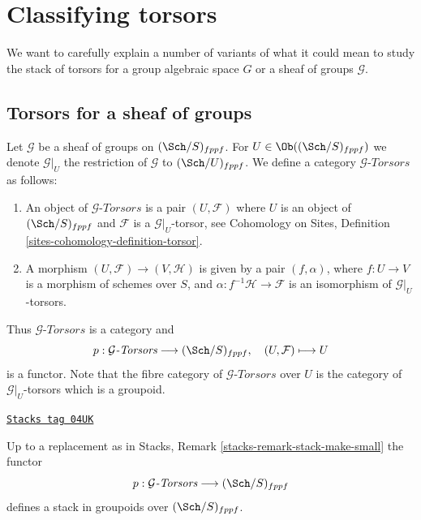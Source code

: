 \section{Classifying torsors}
\label{examples-stacks-section-torsors}
We want to carefully explain a number of variants of what it could
mean to study the stack of torsors for a group algebraic space $G$
or a sheaf of groups $\mathcal{G}$.


\subsection{Torsors for a sheaf of groups}
\label{examples-stacks-subsection-torsors-sheaf}

Let $\mathcal{G}$ be a sheaf of groups on $(\Sch/S)_{fppf}$.
For $U \in \Ob((\Sch/S)_{fppf})$ we denote
$\mathcal{G}|_U$ the restriction of $\mathcal{G}$ to $(\Sch/U)_{fppf}$.
We define a category $\mathcal{G}\textit{-Torsors}$ as follows:
\begin{enumerate}
\item An object of $\mathcal{G}\textit{-Torsors}$ is a pair
$(U, \mathcal{F})$ where $U$ is an object of $(\Sch/S)_{fppf}$
and $\mathcal{F}$ is a $\mathcal{G}|_U$-torsor, see
Cohomology on Sites, Definition \ref{sites-cohomology-definition-torsor}.
\item A morphism $(U, \mathcal{F}) \to (V, \mathcal{H})$ is given
by a pair $(f, \alpha)$, where $f : U \to V$ is a morphism of schemes
over $S$, and $\alpha : f^{-1}\mathcal{H} \to \mathcal{F}$ is an
isomorphism of $\mathcal{G}|_U$-torsors.
\end{enumerate}
Thus $\mathcal{G}\textit{-Torsors}$ is a category and
$$
p : \mathcal{G}\textit{-Torsors} \longrightarrow (\Sch/S)_{fppf},
\quad
(U, \mathcal{F}) \longmapsto U
$$
is a functor. Note that the fibre category of $\mathcal{G}\textit{-Torsors}$
over $U$ is the category of $\mathcal{G}|_U$-torsors which is a groupoid.

\begin{lemma}
\label{examples-stacks-lemma-torsors-sheaf-stack-in-groupoids}
\href{https://stacks.math.columbia.edu/tag/04UK}{\texttt{Stacks tag 04UK}}

Up to a replacement as in
Stacks, Remark \ref{stacks-remark-stack-make-small}
the functor
$$
p : \mathcal{G}\textit{-Torsors} \longrightarrow (\Sch/S)_{fppf}
$$
defines a stack in groupoids over $(\Sch/S)_{fppf}$.
\end{lemma}

